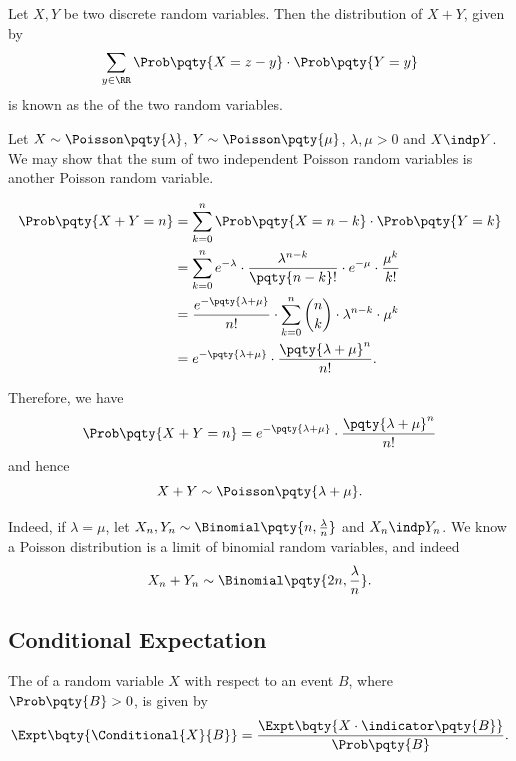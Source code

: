 \begin{definition}
    \label{def:convolution-distribution-discrete}%
    Let \(X, Y\) be two discrete random variables. Then the distribution of \(X + Y\), given by
    \[
        \sum_{y \in \RR} \Prob\pqty{X = z - y} \cdot \Prob\pqty{Y = y}
    \]
    is known as the  of the two random variables.
\end{definition}

\begin{example}
    Let \(X \sim \Poisson\pqty{\lambda}\), \(Y \sim \Poisson\pqty{\mu}\), \(\lambda, \mu > 0\) and \(X \indp Y\). We may show that the sum of two independent Poisson random variables is another Poisson random variable.

    \begin{align*}
        \Prob\pqty{X + Y = n} &= \sum_{k = 0}^{n} \Prob\pqty{X = n - k} \cdot \Prob\pqty{Y = k} \\
        &= \sum_{k = 0}^{n} e^{-\lambda} \cdot \frac{\lambda^{n - k}}{\pqty{n - k}!} \cdot e^{-\mu} \cdot \frac{\mu^k}{k!} \\
        &= \frac{e^{-\pqty{\lambda + \mu}}}{n!} \cdot \sum_{k = 0}^{n} \binom{n}{k} \cdot \lambda^{n - k} \cdot \mu^k \\
        &= e^{-\pqty{\lambda + \mu}} \cdot \frac{\pqty{\lambda + \mu}^n}{n!}.
    \end{align*}

    Therefore, we have
    \[
        \Prob\pqty{X + Y = n} = e^{-\pqty{\lambda + \mu}} \cdot \frac{\pqty{\lambda + \mu}^n}{n!}
    \]
    and hence
    \[
        X + Y \sim \Poisson \pqty{\lambda + \mu}.
    \]

    Indeed, if \(\lambda = \mu\), let \(X_n, Y_n \sim \Binomial\pqty{n, \frac{\lambda}{n}}\) and \(X_n \indp Y_n\). We know a Poisson distribution is a limit of binomial random variables, and indeed
    \[
        X_n + Y_n \sim \Binomial\pqty{2n, \frac{\lambda}{n}}.
    \]
\end{example}

\subsection{Conditional Expectation}

\begin{definition}
    \label{def:conditional-expectation-upon-event}%
    The  of a random variable \(X\) with respect to an event \(B\), where \(\Prob\pqty{B} > 0\), is given by
    \[
        \Expt\bqty{\Conditional{X}{B}} = \frac{\Expt\bqty{X \cdot \indicator\pqty{B}}}{\Prob\pqty{B}}.
    \]
\end{definition}


